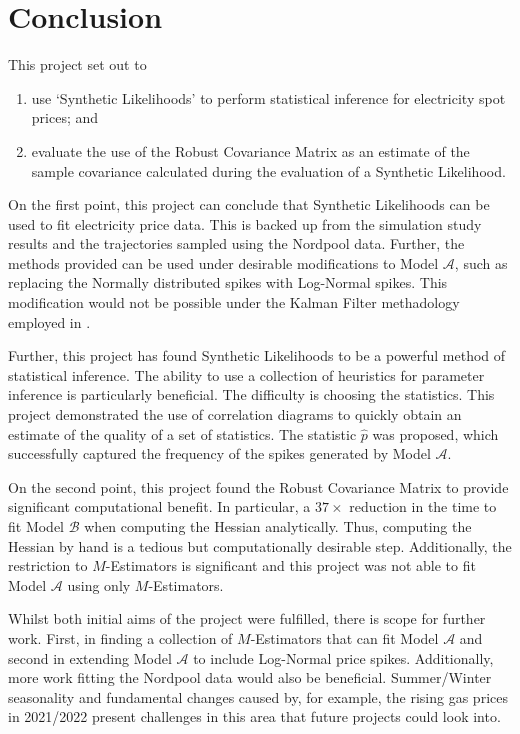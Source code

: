 \section{Conclusion}
\label{sec:eval}

This project set out to

\begin{enumerate}
    \item use `Synthetic Likelihoods' \citep{wood_2010} to perform statistical inference for electricity spot prices; and
    \item evaluate the use of the Robust Covariance Matrix \citep{huber_1967} as an estimate of the sample covariance calculated during the evaluation of a Synthetic Likelihood.
\end{enumerate}

On the first point, this project can conclude that Synthetic Likelihoods can be used to fit electricity price data. This is backed up from the simulation study results and the trajectories sampled using the Nordpool data. Further, the methods provided can be used under desirable modifications to Model $\mathcal{A}$, such as replacing the Normally distributed spikes with Log-Normal spikes. This modification would not be possible under the Kalman Filter methadology employed in \cite{huisman_mahieu_2003}.

Further, this project has found Synthetic Likelihoods to be a powerful method of statistical inference. The ability to use a collection of heuristics for parameter inference is particularly beneficial. The difficulty is choosing the statistics. This project demonstrated the use of correlation diagrams to quickly obtain an estimate of the quality of a set of statistics. The statistic $\hat{p}$ was proposed, which successfully captured the frequency of the spikes generated by Model $\mathcal{A}$.

On the second point, this project found the Robust Covariance Matrix to provide significant computational benefit. In particular, a $37 \times$ reduction in the time to fit Model $\mathcal{B}$ when computing the Hessian analytically. Thus, computing the Hessian by hand is a tedious but computationally desirable step. Additionally, the restriction to $M$-Estimators is significant and this project was not able to fit Model $\mathcal{A}$ using only $M$-Estimators.

Whilst both initial aims of the project were fulfilled, there is scope for further work. First, in finding a collection of $M$-Estimators that can fit Model $\mathcal{A}$ and second in extending Model $\mathcal{A}$ to include Log-Normal price spikes. Additionally, more work fitting the Nordpool data would also be beneficial. Summer/Winter seasonality and fundamental changes caused by, for example, the rising gas prices in 2021/2022 present challenges in this area that future projects could look into.

